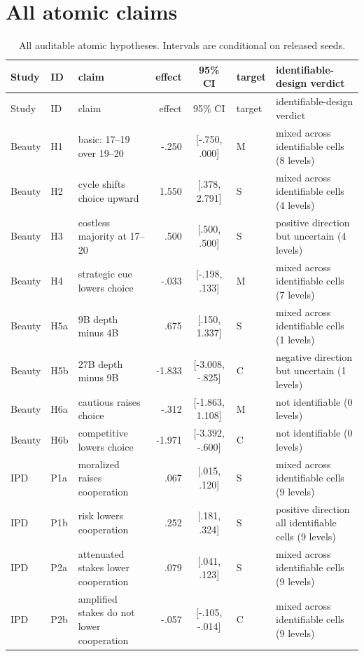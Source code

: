 \documentclass[10pt]{article}
\begin{document}
\section{All atomic claims}
\begin{landscape}
\small
\begin{longtable}{@{}llp{6.0cm}rclp{5.2cm}@{}}
\caption{All auditable atomic hypotheses. Intervals are conditional on released seeds.}\\
\toprule
Study & ID & claim & effect & 95\% CI & target & identifiable-design verdict \\
\midrule
\endfirsthead
\toprule
Study & ID & claim & effect & 95\% CI & target & identifiable-design verdict \\
\midrule
\endhead
Beauty & H1 & basic: 17--19 over 19--20 & -.250 & [-.750, .000] & M & mixed across identifiable cells (8 levels) \\
Beauty & H2 & cycle shifts choice upward & 1.550 & [.378, 2.791] & S & mixed across identifiable cells (4 levels) \\
Beauty & H3 & costless majority at 17--20 & .500 & [.500, .500] & S & positive direction but uncertain (4 levels) \\
Beauty & H4 & strategic cue lowers choice & -.033 & [-.198, .133] & M & mixed across identifiable cells (7 levels) \\
Beauty & H5a & 9B depth minus 4B & .675 & [.150, 1.337] & S & mixed across identifiable cells (1 levels) \\
Beauty & H5b & 27B depth minus 9B & -1.833 & [-3.008, -.825] & C & negative direction but uncertain (1 levels) \\
Beauty & H6a & cautious raises choice & -.312 & [-1.863, 1.108] & M & not identifiable (0 levels) \\
Beauty & H6b & competitive lowers choice & -1.971 & [-3.392, -.600] & C & not identifiable (0 levels) \\
IPD & P1a & moralized raises cooperation & .067 & [.015, .120] & S & mixed across identifiable cells (9 levels) \\
IPD & P1b & risk lowers cooperation & .252 & [.181, .324] & S & positive direction all identifiable cells (9 levels) \\
IPD & P2a & attenuated stakes lower cooperation & .079 & [.041, .123] & S & mixed across identifiable cells (9 levels) \\
IPD & P2b & amplified stakes do not lower cooperation & -.057 & [-.105, -.014] & C & mixed across identifiable cells (9 levels) \\

\end{longtable}
\end{landscape}
\end{document}

